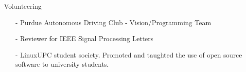 \documentclass{resume} %
\begin{document}

\begin{rSection}{Volunteering}

\begin{itemize}
\setlength{\itemindent}{-.2in}
  \item[-] Purdue Autonomous Driving Club - Vision/Programming Team
  \item[-] Reviewer for IEEE Signal Processing Letters
  \item[-] LinuxUPC student society. Promoted and taughted the use of open source software to university students.
\end{itemize}

\vspace{-1pt}

\end{rSection}
\end{document}
